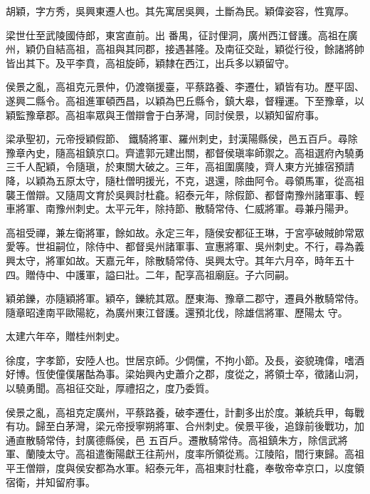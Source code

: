 
\begin{pinyinscope}

 胡穎，字方秀，吳興東遷人也。其先寓居吳興，土斷為民。穎偉姿容，性寬厚。



 梁世仕至武陵國侍郎，東宮直前。出
 番禺，征討俚洞，廣州西江督護。高祖在廣州，穎仍自結高祖，高祖與其同郡，接遇甚隆。及南征交趾，穎從行役，餘諸將帥皆出其下。及平李賁，高祖旋師，穎隸在西江，出兵多以穎留守。



 侯景之亂，高祖克元景仲，仍渡嶺援臺，平蔡路養、李遷仕，穎皆有功。歷平固、遂興二縣令。高祖進軍頓西昌，以穎為巴丘縣令，鎮大皋，督糧運。下至豫章，以穎監豫章郡。高祖率眾與王僧辯會于白茅灣，同討侯景，以穎知留府事。



 梁承聖初，元帝授穎假節、
 鐵騎將軍、羅州刺史，封漢陽縣侯，邑五百戶。尋除豫章內史，隨高祖鎮京口。齊遣郭元建出關，都督侯瑱率師禦之。高祖選府內驍勇三千人配穎，令隨瑱，於東關大破之。三年，高祖圍廣陵，齊人東方光據宿預請降，以穎為五原太守，隨杜僧明援光，不克，退還，除曲阿令。尋領馬軍，從高祖襲王僧辯。又隨周文育於吳興討杜龕。紹泰元年，除假節、都督南豫州諸軍事、輕車將軍、南豫州刺史。太平元年，除持節、散騎常侍、仁威將軍。尋兼丹陽尹。



 高祖受禪，兼左衛將軍，餘如故。永定三年，隨侯安都征王琳，于宮亭破賊帥常眾愛等。世祖嗣位，除侍中、都督吳州諸軍事、宣惠將軍、吳州刺史。不行，尋為義興太守，將軍如故。天嘉元年，除散騎常侍、吳興太守。其年六月卒，時年五十四。贈侍中、中護軍，謚曰壯。二年，配享高祖廟庭。子六同嗣。



 穎弟鑠，亦隨穎將軍。穎卒，鑠統其眾。歷東海、豫章二郡守，遷員外散騎常侍。隨章昭達南平歐陽紇，為廣州東江督護。還預北伐，除雄信將軍、歷陽太
 守。



 太建六年卒，贈桂州刺史。



 徐度，字孝節，安陸人也。世居京師。少倜儻，不拘小節。及長，姿貌瑰偉，嗜酒好博。恆使僮僕屠酤為事。梁始興內史蕭介之郡，度從之，將領士卒，徵諸山洞，以驍勇聞。高祖征交趾，厚禮招之，度乃委質。



 侯景之亂，高祖克定廣州，平蔡路養，破李遷仕，計劃多出於度。兼統兵甲，每戰有功。歸至白茅灣，梁元帝授寧朔將軍、合州刺史。侯景平後，追錄前後戰功，加通直散騎常侍，封廣德縣侯，邑
 五百戶。遷散騎常侍。高祖鎮朱方，除信武將軍、蘭陵太守。高祖遣衡陽獻王往荊州，度率所領從焉。江陵陷，間行東歸。高祖平王僧辯，度與侯安都為水軍。紹泰元年，高祖東討杜龕，奉敬帝幸京口，以度領宿衛，并知留府事。




\end{pinyinscope}
